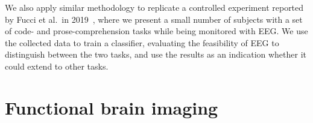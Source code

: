We also apply similar methodology to replicate a controlled experiment reported by Fucci et al.~in 2019~\cite{fucci_replication_2019}, where we present a small number of subjects with a set of code- and prose-comprehension tasks while being monitored with EEG\@. We use the collected data to train a classifier, evaluating the feasibility of EEG to distinguish between the two tasks, and use the results as an indication whether it could extend to other tasks.



% 
%
%
%



\section{Functional brain imaging}\label{section:imaging}

